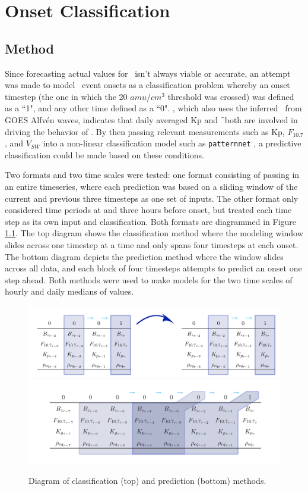 \chapter[Onset Classification]{Onset Classification}

\section{Method}
Since forecasting actual values for \req\ isn't always viable or accurate, an attempt was made to model \req\ event onsets as a classification problem whereby an onset timestep (the one in which the 20 $amu/cm^3$ threshold was crossed) was defined as a ``1", and any other time defined as a ``0". \cite{Denton2016}, which also uses the inferred \req\ from GOES Alfvén waves, indicates that daily averaged Kp and \f\ both are involved in driving the behavior of \req. By then passing relevant measurements such as Kp, $F_{10.7}$, and $V_{SW}$ into a non-linear classification model such as \texttt{patternnet} \citep{MATLAB:2014}, a predictive classification could be made based on these conditions. 

Two formats and two time scales were tested: one format consisting of passing in an entire timeseries, where each prediction was based on a sliding window of the current and previous three timesteps as one set of inputs. The other format only considered time periods at and three hours before onset, but treated each time step as its own input and classification. Both formats  are diagrammed in Figure \ref{fig:ClassifyDiagram}. The top diagram shows the classification method where the modeling window slides across one timestep at a time and only spans four timesteps at each onset. The bottom diagram depicts the prediction method where the window slides across all data, and each block of four timesteps attempts to predict an onset one step ahead. Both methods were used to make models for the two time scales of hourly and daily medians of values. 

\begin{figure}[htp!]
	\centering
	\includegraphics[width=1\linewidth]{Figures/CH5/ClassifyGraphic2.png}
	\includegraphics[width=1\linewidth]{Figures/CH5/FullGraphic.png}
	\caption{Diagram of classification (top) and prediction (bottom) methods.}
	\label{fig:ClassifyDiagram}
\end{figure}


